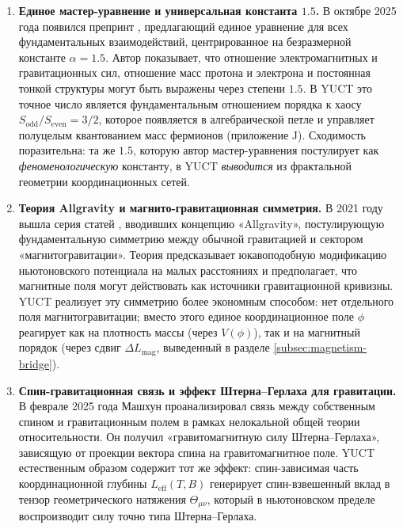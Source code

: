 \documentclass[12pt]{article}
\theoremstyle{remark}
\begin{document}
	\begin{enumerate}
		
		\item \textbf{Единое мастер-уравнение и универсальная константа $1.5$.}
		В октябре 2025 года появился препринт \cite{UnifiedMaster2025}, предлагающий единое уравнение для всех фундаментальных взаимодействий, центрированное на безразмерной константе $\alpha = 1.5$. Автор показывает, что отношение электромагнитных и гравитационных сил, отношение масс протона и электрона и постоянная тонкой структуры могут быть выражены через степени $1.5$.
		В YUCT это точное число является фундаментальным отношением порядка к хаосу $S_{\mathrm{odd}}/S_{\mathrm{even}} = 3/2$, которое появляется в алгебраической петле и управляет полуцелым квантованием масс фермионов (приложение J).
		Сходимость поразительна: та же $1.5$, которую автор мастер-уравнения постулирует как \emph{феноменологическую} константу, в YUCT \emph{выводится} из фрактальной геометрии координационных сетей.
		
		\item \textbf{Теория Allgravity и магнито-гравитационная симметрия.}
		В 2021 году вышла серия статей \cite{Allgravity2021}, вводивших концепцию «Allgravity», постулирующую фундаментальную симметрию между обычной гравитацией и сектором «магнитогравитации». Теория предсказывает юкавоподобную модификацию ньютоновского потенциала на малых расстояниях и предполагает, что магнитные поля могут действовать как источники гравитационной кривизны.
		YUCT реализует эту симметрию более экономным способом: нет отдельного поля магнитогравитации; вместо этого единое координационное поле $\phi$ реагирует как на плотность массы (через $V(\phi)$), так и на магнитный порядок (через сдвиг $\Delta L_{\mathrm{mag}}$, выведенный в разделе \ref{subsec:magnetism-bridge}).
		
		\item \textbf{Спин-гравитационная связь и эффект Штерна–Герлаха для гравитации.}
		В феврале 2025 года Машхун \cite{Mashhoon2025} проанализировал связь между собственным спином и гравитационным полем в рамках нелокальной общей теории относительности. Он получил «гравитомагнитную силу Штерна–Герлаха», зависящую от проекции вектора спина на гравитомагнитное поле.
		YUCT естественным образом содержит тот же эффект: спин-зависимая часть координационной глубины $L_{\mathrm{eff}}(T,B)$ генерирует спин-взвешенный вклад в тензор геометрического натяжения $\Theta_{\mu\nu}$, который в ньютоновском пределе воспроизводит силу точно типа Штерна–Герлаха.
		

\end{enumerate}
\end{document}
